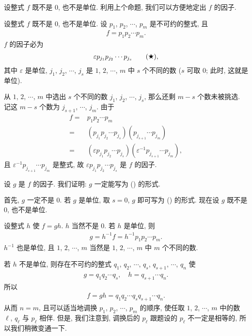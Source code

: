 设整式 $f$ 既不是 $0$, 也不是单位. 利用上个命题, 我们可以方便地定出 $f$ 的因子.

\begin{proposition}
    设整式 $f$ 既不是 $0$, 也不是单位. 设 $p_1$, $p_2$, $\cdots$, $p_m$ 是不可约的整式, 且
    \begin{align*}
        f = p_1 p_2 \cdots p_m.
    \end{align*}
    $f$ 的因子必为
    \begin{align*}
        \varepsilon p_{j_1} p_{j_2} \cdots p_{j_s} \tag*{(\ding{72})},
    \end{align*}
    其中 $\varepsilon$ 是单位, $j_1$, $j_2$, $\cdots$, $j_s$ 是 $1$, $2$, $\cdots$, $m$ 中 $s$ 个不同的数 ($s$ 可取 $0$; 此时, 这就是单位).
\end{proposition}

\begin{pf}
    从 $1$, $2$, $\cdots$, $m$ 中选出 $s$ 个不同的数 $j_1$, $j_2$, $\cdots$, $j_s$, 那么还剩 $m-s$ 个数未被挑选. 记这 $m-s$ 个数为 $j_{s+1}$, $\cdots$, $j_m$. 由于
    \begin{align*}
        f
        = {} & p_1 p_2 \cdots p_m                                                                          \\
        = {} & (p_{j_1} p_{j_2} \cdots p_{j_s}) (p_{j_{s+1}} \cdots p_{j_m})                               \\
        = {} & (\varepsilon p_{j_1} p_{j_2} \cdots p_{j_s}) (\varepsilon^{-1} p_{j_{s+1}} \cdots p_{j_m}),
    \end{align*}
    且 $\varepsilon^{-1} p_{j_{s+1}} \cdots p_{j_m}$ 是整式, 故 $\varepsilon p_{j_1} p_{j_2} \cdots p_{j_s}$ 是 $f$ 的因子.

    设 $g$ 是 $f$ 的因子. 我们证明: $g$ 一定能写为 () 的形式.

    首先, $g$ 一定不是 $0$. 若 $g$ 是单位, 取 $s = 0$, $g$ 即可写为 () 的形式. 现在设 $g$ 既不是 $0$, 也不是单位.

    设整式 $h$ 使 $f = gh$. $h$ 当然不是 $0$. 若 $h$ 是单位, 则
    \begin{align*}
        g = h^{-1} f = h^{-1} p_1 p_2 \cdots p_m.
    \end{align*}
    $h^{-1}$ 也是单位, 且 $1$, $2$, $\cdots$, $m$ 当然是 $1$, $2$, $\cdots$, $m$ 中 $m$ 个不同的数.

    若 $h$ 不是单位, 则存在不可约的整式 $q_1$, $q_2$, $\cdots$, $q_s$, $q_{s+1}$, $\cdots$, $q_n$ 使
    \begin{align*}
        g = q_1 q_2 \cdots q_s, \quad h = q_{s+1} \cdots q_n.
    \end{align*}
    所以
    \begin{align*}
        f = gh = q_1 q_2 \cdots q_s q_{s+1} \cdots q_n.
    \end{align*}
    从而 $n = m$, 且可以适当地调换 $p_1$, $p_2$, $\cdots$, $p_m$ 的顺序, 使任取 $1$, $2$, $\cdots$, $m$ 中的数 $\ell$, $q_\ell$ 与 $p_\ell$ 相伴. 但是, 我们注意到, 调换后的 $p_{\ell}$ 跟题设的 $p_{\ell}$ 不一定是相等的, 所以我们稍微变通一下.


\end{pf}

